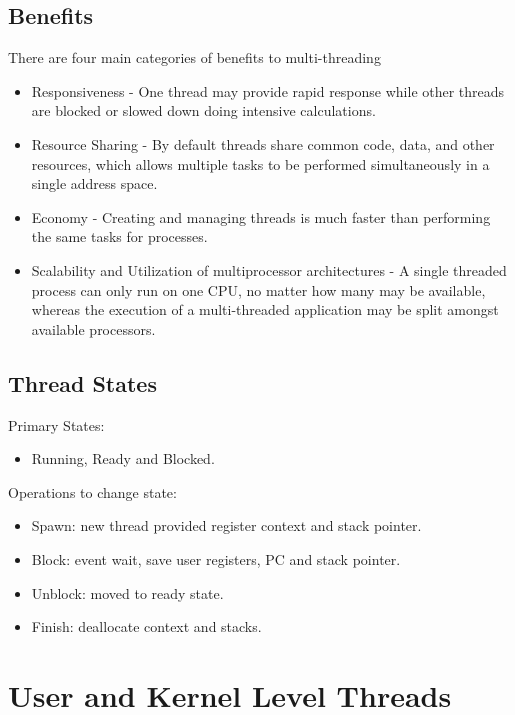 \documentclass[12pt]{extarticle}
\begin{document}
\subsection{Benefits}

There are four main categories of benefits to multi-threading

\begin{itemize}
    \item Responsiveness - One thread may provide rapid response while other threads are blocked or slowed down doing intensive calculations.
    \item Resource Sharing - By default threads share common code, data, and other resources, which allows multiple tasks to be performed simultaneously in a single address space.
    \item Economy - Creating and managing threads is much faster than performing the same tasks for processes.
    \item Scalability and Utilization of multiprocessor architectures - A single threaded process can only run on one CPU, no matter how many may be available, whereas the execution of a multi-threaded application may be split amongst available processors.
\end{itemize}

\subsection{Thread States}

Primary States:
\begin{itemize}
    \item Running, Ready and Blocked.
\end{itemize}

Operations to change state:
\begin{itemize}
    \item Spawn: new thread provided register context and stack pointer.
    \item Block: event wait, save user registers, PC and stack pointer.
    \item Unblock: moved to ready state.
    \item Finish: deallocate context and stacks.
\end{itemize}

\newpage 

\section{User and Kernel Level Threads}
\end{document}
